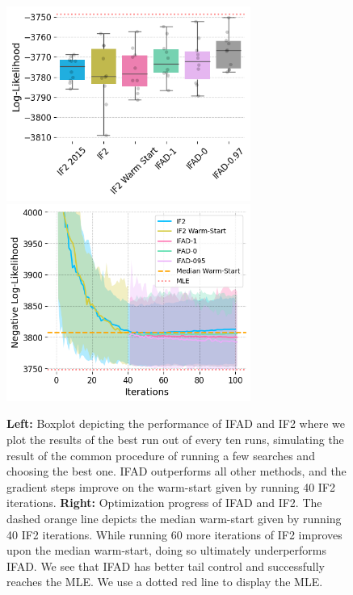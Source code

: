 \documentclass[11pt]{article}
\newcommand\arxiv[2]{#1} %
\begin{document}

  
\begin{figure}[ht]
    \includegraphics[width=\arxiv{8cm}{\textwidth/\real{4.2}}]{../imgs/095/boxplot.png}
    \includegraphics[width=\arxiv{8cm}{\textwidth/\real{4.2}}]{../imgs/095/optim.png}
    \caption{\textbf{Left:} Boxplot depicting the performance of IFAD and IF2 where we plot the results of the best run out of every ten runs, simulating the result of the common procedure of running a few searches and choosing the best one. IFAD outperforms all other methods, and the gradient steps improve on the warm-start given by running 40 IF2 iterations. 
    \textbf{Right:} Optimization progress of IFAD and IF2. The dashed orange line depicts the median warm-start given by running 40 IF2 iterations. While running 60 more iterations of IF2 improves upon the median warm-start, doing so ultimately underperforms IFAD. We see that IFAD has better tail control and successfully reaches the MLE. 
    We use a dotted red line to display the MLE.}
    \label{fig:boxplot-search}
\end{figure}
\end{document}
